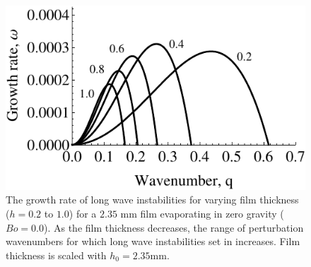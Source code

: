 \documentclass[a4paper,12pt]{article}
\begin{document}



  \begin{figure}
   \centering
   \includegraphics[width=\linewidth]{Fig25.pdf} 	
   \caption{The growth rate of long wave instabilities for varying film thickness ($h=0.2$ to $1.0$) for a $2.35$ mm film evaporating in zero gravity ($Bo=0.0$). As the film thickness decreases, the range of perturbation wavenumbers for which long wave instabilities set in increases. Film thickness is scaled with $h_0=2.35$mm.}
   \label{omega_q_1}
  \end{figure}

\end{document}
